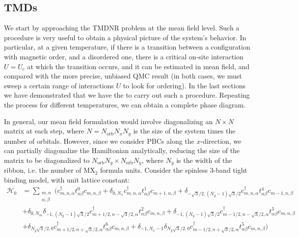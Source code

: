 \subsection{\acp{TMD}}
\label{subsec:apTMD}

We start by approaching the \acs{TMDNR} problem at the mean field level.
Such a procedure is very useful to obtain a physical picture of the system's behavior.
In particular, at a given temperature, if there is a transition between a configuration with magnetic order, and a disordered one, there is a critical on-site interaction $U = U_c$ at which the transition occurs, and it can be estimated in mean field, and compared with the more precise, unbiased \acs{QMC} result (in both cases, we must sweep a certain range of interactions $U$ to look for ordering).
In the last sections we have demonstrated that we have the  to carry out such a procedure.
Repeating the process for different temperatures, we can obtain a complete phase diagram.

In general, our mean field formulation would involve diagonalizing an $N \times N$ matrix at each step, where $N = N_{\text{orb}} N_x N_y$ is the size of the system times the number of orbitals.
However, since we consider \acs{PBC}s along the $x$-direction, we can partially diagonalize  the Hamiltonian analytically, reducing the size of the matrix to be diagonalized to $N_{\text{orb}} N_y \times N_{\text{orb}} N_y$, where $N_y$ is the width of the ribbon, i.e. the number of $\text{M}\text{X}_2$ formula units.
Consider the spinless 3-band tight binding model, with unit lattice constant:
\begin{equation}
\begin{split}
\mathcal{H}_0 &= \sum_{\substack{m, n \\ \alpha, \beta}} \bigg( c_{m,n, \alpha}^\dagger t_{\alpha\beta}^0 c_{m, n, \beta} + \delta_{0, N_x}  c_{m,n, \alpha}^\dagger t_{\alpha\beta}^1 c_{m+1, n, \beta} + \delta_{-\sqrt{3}/2, (N_y -1)\sqrt{3}/2}  c_{m,n, \alpha}^\dagger t_{\alpha\beta}^4 c_{m-1, n, \beta} \\
& + \delta_{0, N_m} \delta_{-1, (N_y -1)\sqrt{3}/2} c_{m+1/2,n-\sqrt{3}/2, \alpha}^\dagger t_{\alpha\beta}^2 c_{m, n, \beta} + \delta_{-1, (N_y -1)\sqrt{3}/2} c_{m-1/2,n-\sqrt{3}/2, \alpha}^\dagger t_{\alpha\beta}^3 c_{m, n, \beta} \\
& + \delta_{N_y\sqrt{3}/2, 0} c_{m+1/2,n+\sqrt{3}/2, \alpha}^\dagger t_{\alpha\beta}^6 c_{m, n, \beta} + \delta_{-1, N_x -1} \delta_{N_y\sqrt{3}/2, 0} c_{m-1/2,n+\sqrt{3}/2, \alpha}^\dagger t_{\alpha\beta}^5 c_{m, n, \beta} \bigg)
\end{split}
\end{equation}

